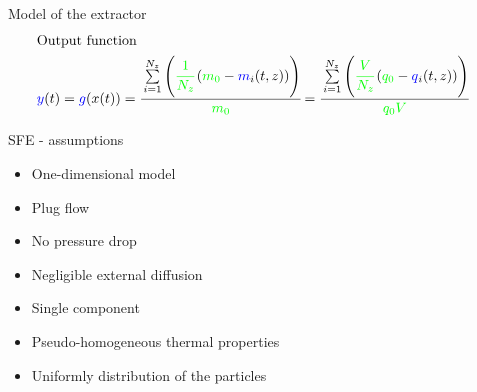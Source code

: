 \documentclass[8pt]{beamer}
\begin{document}
\begin{frame}{Model of the extractor}
{\begin{align*}
		\intertext{Output function}
			\textcolor{blue}{y}(t) &= \textcolor{blue}{g}(x(t)) =\cfrac{\sum\limits_{i=1}^{N_z}  \left(  \textcolor{green}{\cfrac{1}{N_z}} \left(\textcolor{green}{m_0} - \textcolor{blue}{m}_i(t,z) \right) \right) }{\textcolor{green}{m_0}} =  \cfrac{\sum\limits_{i=1}^{N_z}  \left(  \textcolor{green}{\cfrac{V}{N_z}} \left(\textcolor{green}{q_0} - \textcolor{blue}{q}_i(t,z) \right) \right) }{\textcolor{green}{q_0 V}}
		\end{align*}}
	\end{frame}

	\begin{frame}[fragile]{SFE - assumptions}
	\begin{itemize}
		\item One-dimensional model
		\item Plug flow 
		\item No pressure drop
		\item Negligible external diffusion 
		\item Single component
		\item Pseudo-homogeneous thermal properties
		\item Uniformly distribution of the particles
	\end{itemize}
	\end{frame}
	
\end{document}
